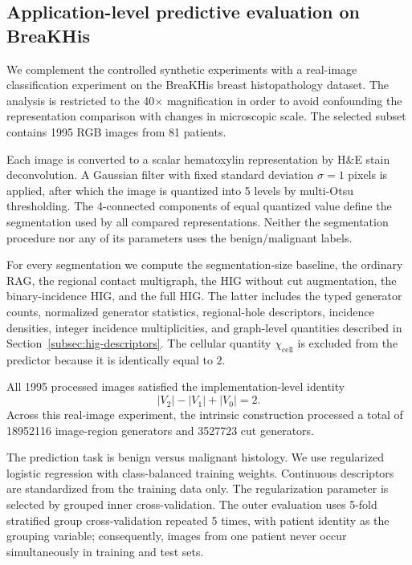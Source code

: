 \subsection{Application-level predictive evaluation on BreaKHis}
\label{subsec:breakhis-predictive}

We complement the controlled synthetic experiments with a real-image
classification experiment on the BreaKHis breast histopathology dataset.
The analysis is restricted to the 40$\times$ magnification in
order to avoid confounding the representation comparison with changes in
microscopic scale. The selected subset contains 1995 RGB images from
81 patients.



Each image is converted to a scalar hematoxylin representation by H\&E
stain deconvolution. A Gaussian filter with fixed standard deviation
$\sigma=1$ pixels is applied, after which the image is
quantized into 5 levels by multi-Otsu thresholding. The
4-connected components of equal quantized value define the segmentation
used by all compared representations. Neither the segmentation procedure
nor any of its parameters uses the benign/malignant labels.

For every segmentation we compute the segmentation-size baseline, the
ordinary RAG, the regional contact multigraph, the HIG without cut
augmentation, the binary-incidence HIG, and the full HIG. The latter
includes the typed generator counts, normalized generator statistics,
regional-hole descriptors, incidence densities, integer incidence
multiplicities, and graph-level quantities described in
Section~\ref{subsec:hig-descriptors}. The cellular quantity
$\chi_{\mathrm{cell}}$ is excluded from the predictor because it is
identically equal to $2$.

All 1995 processed images satisfied the implementation-level
identity
\[
|V_2|-|V_1|+|V_0|=2.
\]
Across this real-image experiment, the intrinsic construction processed
a total of 18952116 image-region generators and
3527723 cut generators.

The prediction task is benign versus malignant histology. We use
regularized logistic regression with class-balanced training weights.
Continuous descriptors are standardized from the training data only.
The regularization parameter is selected by grouped inner
cross-validation. The outer evaluation uses
5-fold stratified group cross-validation repeated
5 times, with patient identity as the grouping variable;
consequently, images from one patient never occur simultaneously in
training and test sets.

